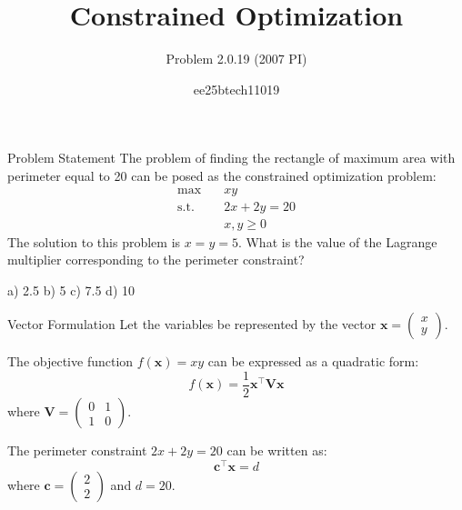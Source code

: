 \documentclass{beamer}
\title{Constrained Optimization}
\subtitle{Problem 2.0.19 (2007 PI)}
\author{ee25btech11019}
\date{}
\begin{document}
\begin{frame}
    \titlepage
\end{frame}

\begin{frame}{Problem Statement}
    The problem of finding the rectangle of maximum area with perimeter equal to 20 can be posed as the constrained optimization problem:
    \begin{align*}
        \max \quad & xy \\
        \text{s.t.} \quad & 2x + 2y = 20 \\
        & x, y \geq 0
    \end{align*}
    The solution to this problem is $x = y = 5$. What is the value of the Lagrange multiplier corresponding to the perimeter constraint?
    
    \vspace{0.5cm}
    a) 2.5 \hspace{1cm} b) 5 \hspace{1cm} c) 7.5 \hspace{1cm} d) 10
\end{frame}

\begin{frame}{Vector Formulation}
    Let the variables be represented by the vector $\mathbf{x} = \begin{pmatrix} x \\ y \end{pmatrix}$.
    
    The objective function $f(\mathbf{x}) = xy$ can be expressed as a quadratic form:
    \begin{equation}
        f(\mathbf{x}) = \frac{1}{2} \mathbf{x}^\top \mathbf{V} \mathbf{x}
    \end{equation}
    where $\mathbf{V} = \begin{pmatrix} 0 & 1 \\ 1 & 0 \end{pmatrix}$.
    
    \vspace{0.5cm}
    The perimeter constraint $2x + 2y = 20$ can be written as:
    \begin{equation}
        \mathbf{c}^\top \mathbf{x} = d
    \end{equation}
    where $\mathbf{c} = \begin{pmatrix} 2 \\ 2 \end{pmatrix}$ and $d = 20$.
\end{frame}
\end{document}
